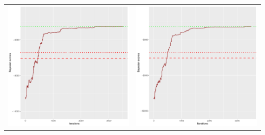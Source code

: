 \documentclass[]{scrartcl}
\begin{document}
\begin{table}[h!]
\begin{tabular}{cc}
\includegraphics[scale = 0.4]{./figs/alarm/v3/30/bayBoundsEvolution-3502.pdf} & 
\includegraphics[scale = 0.4]{./figs/alarm/v3/50/bayBoundsEvolution-3502.pdf} \\

\end{tabular}
\end{table}
\end{document}
